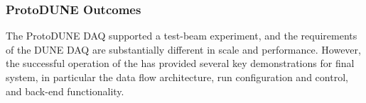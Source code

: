 
\subsubsection{ProtoDUNE Outcomes}

The ProtoDUNE DAQ supported a test-beam experiment, and the requirements of the DUNE DAQ are substantially different in scale and performance.
However, the successful operation of the   has provided several key demonstrations for final system, in particular the data flow architecture, run configuration and control, and back-end functionality.

